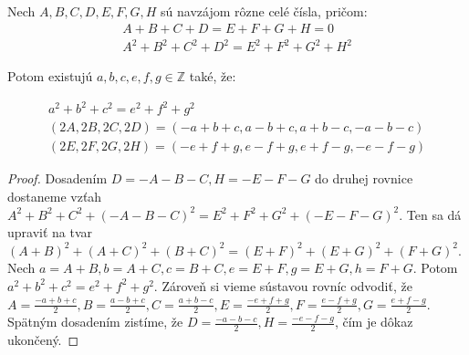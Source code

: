

\begin{theorem}
\label{5x5bimagic2}
Nech $A, B, C, D, E, F, G, H$ sú navzájom rôzne celé čísla, pričom:
\begin{gather}
A + B + C + D = E + F + G + H = 0 \\
A^2 + B^2 + C^2 + D^2 = E^2 + F^2 + G^2 + H^2
\end{gather}

Potom existujú $a,b,c,e,f,g \in \mathbb{Z}$ také, že:

\begin{gather}
a^2 + b^2 + c^2 = e^2 + f^2 + g^2 \\
(2A,2B,2C,2D) = (-a+b+c, a-b+c,a+b-c, -a-b-c) \\
(2E,2F,2G,2H) = (-e+f+g, e-f+g, e+f-g, -e-f-g)
\end{gather}

\end{theorem}

\begin{proof} Dosadením $D = -A-B-C, H = -E-F-G$ do druhej rovnice dostaneme vzťah $A^2 + B^2 + C^2 + (-A-B-C)^2 = E^2 + F^2 + G^2 + (-E-F-G)^2$. Ten sa dá upraviť na tvar $(A+B)^2 + (A+C)^2 + (B+C)^2 = (E+F)^2 + (E+G)^2 + (F+G)^2$. Nech $a = A+B, b = A+C, c = B+C, e = E+F, g = E+G, h = F+G$. Potom $a^2 + b^2 + c^2 = e^2 + f^2 + g^2$. Zároveň si vieme sústavou rovníc odvodiť, že $A = \frac{-a+b+c}{2}, B = \frac{a-b+c}{2}, C = \frac{a+b-c}{2}, E = \frac{-e+f+g}{2}, F = \frac{e-f+g}{2}, G = \frac{e+f-g}{2}$. Spätným dosadením zistíme, že $D = \frac{-a-b-c}{2}, H = \frac{-e-f-g}{2}$, čím je dôkaz ukončený.
\end{proof}

